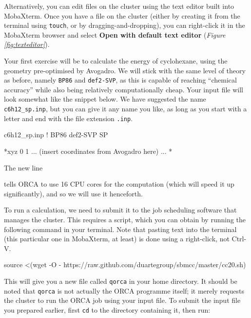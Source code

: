 \documentclass[10pt]{article}
\newcommand{\figref}[1]{\textit{Figure \ref{fig:#1}}}
\begin{document}
Alternatively, you can edit files on the cluster using the text editor built into MobaXterm. Once you have a file on the cluster (either by creating it from the terminal using \texttt{touch}, or by dragging-and-dropping), you can right-click it in the MobaXterm browser and select \textbf{Open with default text editor} (\figref{texteditor}).

Your first exercise will be to calculate the energy of cyclohexane, using the geometry pre-optimised by Avogadro. We will stick with the same level of theory as before, namely \texttt{BP86} and \texttt{def2-SVP}, as this is capable of reaching ``chemical accuracy'' while also being relatively computationally cheap. Your input file will look somewhat like the snippet below. We have suggested the name \texttt{c6h12\_sp.inp}, but you can give it any name you like, as long as you start with a letter and end with the file extension \texttt{.inp}.

\begin{script}{c6h12\_sp.inp}
! BP86 def2-SVP SP


*xyz 0 1
 ... (insert coordinates from Avogadro here) ...
*
\end{script}

The new line

\begin{cmdline}
\end{cmdline}

tells ORCA to use 16 CPU cores for the computation (which will speed it up significantly), and so we will use it henceforth.

To run a calculation, we need to submit it to the job scheduling software that manages the cluster. This requires a script, which you can obtain by running the following command in your terminal. Note that pasting text into the terminal (this particular one in MobaXterm, at least) is done using a right-click, not Ctrl-V. 

\begin{cmdline}
source <(wget -O - https://raw.github.com/duartegroup/sbmcc/master/cc20.sh)
\end{cmdline}

This will give you a new file called \texttt{qorca} in your home directory. It should be noted that \texttt{qorca} is not actually the ORCA programme itself; it merely requests the cluster to run the ORCA job using your input file.  To submit the input file you prepared earlier, first \texttt{cd} to the directory containing it, then run:
\end{document}
